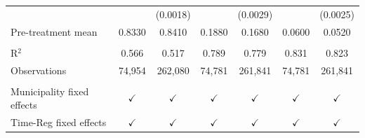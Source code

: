\begin{tabular}{lcccccc}
                              &                & (0.0018)       &                 & (0.0029)        &                & (0.0025)\\   
   Pre-treatment mean         & 0.8330         & 0.8410         & 0.1880          & 0.1680          & 0.0600         & 0.0520\\  
    \\
   R$^2$                      & 0.566          & 0.517          & 0.789           & 0.779           & 0.831          & 0.823\\  
   Observations               & 74,954         & 262,080        & 74,781          & 261,841         & 74,781         & 261,841\\  
    \\
   Municipality fixed effects & $\checkmark$   & $\checkmark$   & $\checkmark$    & $\checkmark$    & $\checkmark$   & $\checkmark$\\   
   Time-Reg fixed effects     & $\checkmark$   & $\checkmark$   & $\checkmark$    & $\checkmark$    & $\checkmark$   & $\checkmark$\\   
   \bottomrule
\end{tabular}
\par\endgroup


